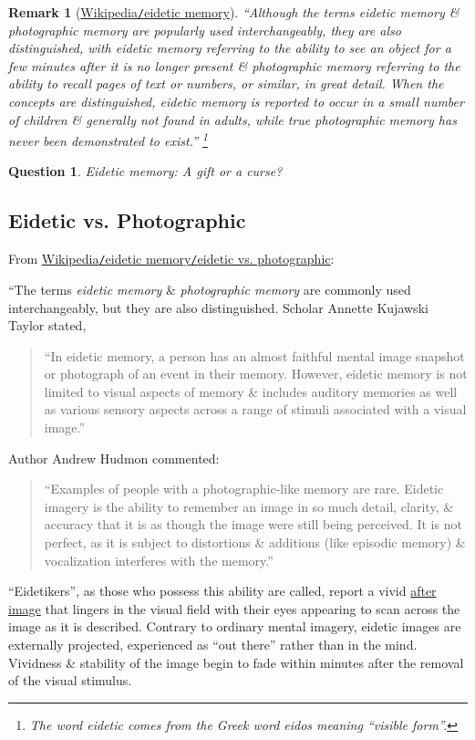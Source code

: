 \documentclass[oneside]{book}
\numberwithin{equation}{section}
\newtheorem{question}{Question}[chapter]
\newtheorem{remark}{Remark}[chapter]
\begin{document}
\begin{remark}[\href{https://en.wikipedia.org/wiki/Eidetic_memory}{Wikipedia\texttt{/}eidetic memory}]
	``Although the terms \emph{eidetic memory} \& \emph{photographic memory} are popularly used interchangeably, they are also distinguished, with \emph{eidetic memory} referring to the ability to see an object for a few minutes after it is no longer present \& \emph{photographic memory} referring to the ability to recall pages of text or numbers, or similar, in great detail. When the concepts are distinguished, eidetic memory is reported to occur in a small number of children \& generally not found in adults, while true photographic memory has never been demonstrated to exist.'' \footnote{The word eidetic comes from the Greek word \textit{eidos} meaning ``visible form''.}
\end{remark}

\begin{question}
	Eidetic memory: A gift or a curse?
\end{question}

\subsection{Eidetic vs. Photographic}
From \href{https://en.wikipedia.org/wiki/Eidetic_memory#Eidetic_vs._photographic}{Wikipedia\texttt{/}eidetic memory\texttt{/}eidetic vs. photographic}:

``The terms \textit{eidetic memory} \& \textit{photographic memory} are commonly used interchangeably, but they are also distinguished. Scholar Annette Kujawski Taylor stated,
\begin{quotation}
	``In eidetic memory, a person has an almost faithful mental image snapshot or photograph of an event in their memory. However, eidetic memory is not limited to visual aspects of memory \& includes auditory memories as well as various sensory aspects across a range of stimuli associated with a visual image.''
\end{quotation}
Author Andrew Hudmon commented:
\begin{quotation}
	``Examples of people with a photographic-like memory are rare. Eidetic imagery is the ability to remember an image in so much detail, clarity, \& accuracy that it is as though the image were still being perceived. It is not perfect, as it is subject to distortions \& additions (like episodic memory) \& vocalization interferes with the memory.''
\end{quotation}
``Eidetikers'', as those who possess this ability are called, report a vivid \href{https://en.wikipedia.org/wiki/Afterimage}{after image} that lingers in the visual field with their eyes appearing to scan across the image as it is described. Contrary to ordinary mental imagery, eidetic images are externally projected, experienced as ``out there'' rather than in the mind. Vividness \& stability of the image begin to fade within minutes after the removal of the visual stimulus.
\end{document}
